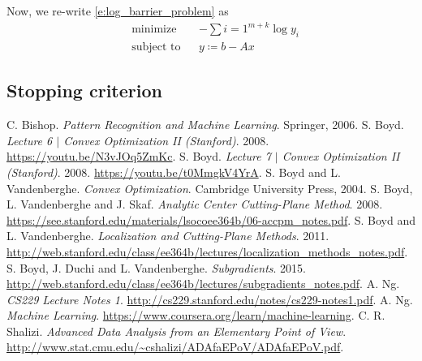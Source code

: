 \documentclass[11pt]{amsart}
\theoremstyle{definition}
\theoremstyle{remark}
\begin{document}
        Now, we re-write \eqref{e:log_barrier_problem} as
        \begin{equation*}
            \begin{aligned}
            & {\text{minimize}} && -\sum{i=1}^{m+k} \log{y_i} \\
            & \text{subject to} && y \coloneqq b - Ax
            \end{aligned}
        \end{equation*}



    \subsection{Stopping criterion}

\renewcommand\refname{Bibliography}
\begin{thebibliography}{99}
     C. Bishop. \emph{Pattern Recognition and Machine Learning}. Springer, 2006.
    \bibitem[Boy08A] S. Boyd. \emph{Lecture 6 $|$ Convex Optimization II (Stanford)}. 2008. \url{https://youtu.be/N3vJOq5ZmKc}.
    \bibitem[Boy08B] S. Boyd. \emph{Lecture 7 $|$ Convex Optimization II (Stanford)}. 2008. \url{https://youtu.be/t0MmgkV4YrA}.
     S. Boyd and L. Vandenberghe. \emph{Convex Optimization}. Cambridge University Press, 2004.
     S. Boyd, L. Vandenberghe and J. Skaf. \emph{Analytic Center Cutting-Plane Method}. 2008. \url{https://see.stanford.edu/materials/lsocoee364b/06-accpm_notes.pdf}.
     S. Boyd and L. Vandenberghe. \emph{Localization and Cutting-Plane Methods}. 2011. \url{http://web.stanford.edu/class/ee364b/lectures/localization_methods_notes.pdf}.
     S. Boyd, J. Duchi and L. Vandenberghe. \emph{Subgradients}. 2015. \url{http://web.stanford.edu/class/ee364b/lectures/subgradients_notes.pdf}.
     A. Ng. \emph{CS229 Lecture Notes 1}. \url{http://cs229.stanford.edu/notes/cs229-notes1.pdf}.
     A. Ng. \emph{Machine Learning}. \url{https://www.coursera.org/learn/machine-learning}.
     C. R. Shalizi. \emph{Advanced Data Analysis
    from an Elementary Point of View}. \url{http://www.stat.cmu.edu/~cshalizi/ADAfaEPoV/ADAfaEPoV.pdf}. 
\end{thebibliography}




\end{document}
